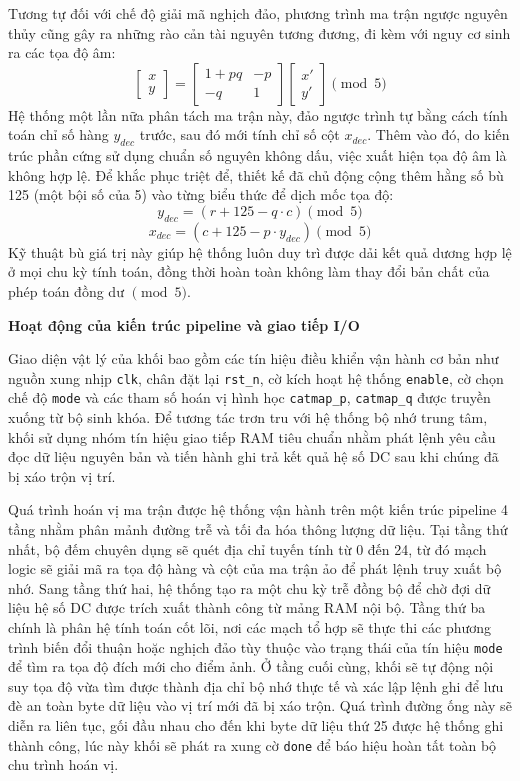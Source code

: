 Tương tự đối với chế độ giải mã nghịch đảo, phương trình ma trận ngược nguyên thủy cũng gây ra những rào cản tài nguyên tương đương, đi kèm với nguy cơ sinh ra các tọa độ âm:
$$ \begin{bmatrix} x \\ y \end{bmatrix} = \begin{bmatrix} 1+pq & -p \\ -q & 1 \end{bmatrix} \begin{bmatrix} x' \\ y' \end{bmatrix} \pmod 5 $$
Hệ thống một lần nữa phân tách ma trận này, đảo ngược trình tự bằng cách tính toán chỉ số hàng $y_{dec}$ trước, sau đó mới tính chỉ số cột $x_{dec}$. Thêm vào đó, do kiến trúc phần cứng sử dụng chuẩn số nguyên không dấu, việc xuất hiện tọa độ âm là không hợp lệ. Để khắc phục triệt để, thiết kế đã chủ động cộng thêm hằng số bù 125 (một bội số của 5) vào từng biểu thức để dịch mốc tọa độ:
$$ y_{dec} = (r + 125 - q \cdot c) \pmod 5 $$
$$ x_{dec} = (c + 125 - p \cdot y_{dec}) \pmod 5 $$
Kỹ thuật bù giá trị này giúp hệ thống luôn duy trì được dải kết quả dương hợp lệ ở mọi chu kỳ tính toán, đồng thời hoàn toàn không làm thay đổi bản chất của phép toán đồng dư $\pmod 5$.

\textbf{Hoạt động của kiến trúc pipeline và giao tiếp I/O}

Giao diện vật lý của khối bao gồm các tín hiệu điều khiển vận hành cơ bản như nguồn xung nhịp \texttt{clk}, chân đặt lại \texttt{rst\_n}, cờ kích hoạt hệ thống \texttt{enable}, cờ chọn chế độ \texttt{mode} và các tham số hoán vị hình học \texttt{catmap\_p}, \texttt{catmap\_q} được truyền xuống từ bộ sinh khóa. Để tương tác trơn tru với hệ thống bộ nhớ trung tâm, khối sử dụng nhóm tín hiệu giao tiếp RAM tiêu chuẩn nhằm phát lệnh yêu cầu đọc dữ liệu nguyên bản và tiến hành ghi trả kết quả hệ số DC sau khi chúng đã bị xáo trộn vị trí.

Quá trình hoán vị ma trận được hệ thống vận hành trên một kiến trúc pipeline 4 tầng nhằm phân mảnh đường trễ và tối đa hóa thông lượng dữ liệu. Tại tầng thứ nhất, bộ đếm chuyên dụng sẽ quét địa chỉ tuyến tính từ 0 đến 24, từ đó mạch logic sẽ giải mã ra tọa độ hàng và cột của ma trận ảo để phát lệnh truy xuất bộ nhớ. Sang tầng thứ hai, hệ thống tạo ra một chu kỳ trễ đồng bộ để chờ đợi dữ liệu hệ số DC được trích xuất thành công từ mảng RAM nội bộ. Tầng thứ ba chính là phân hệ tính toán cốt lõi, nơi các mạch tổ hợp sẽ thực thi các phương trình biến đổi thuận hoặc nghịch đảo tùy thuộc vào trạng thái của tín hiệu \texttt{mode} để tìm ra tọa độ đích mới cho điểm ảnh. Ở tầng cuối cùng, khối sẽ tự động nội suy tọa độ vừa tìm được thành địa chỉ bộ nhớ thực tế và xác lập lệnh ghi để lưu đè an toàn byte dữ liệu vào vị trí mới đã bị xáo trộn. Quá trình đường ống này sẽ diễn ra liên tục, gối đầu nhau cho đến khi byte dữ liệu thứ 25 được hệ thống ghi thành công, lúc này khối sẽ phát ra xung cờ \texttt{done} để báo hiệu hoàn tất toàn bộ chu trình hoán vị.


